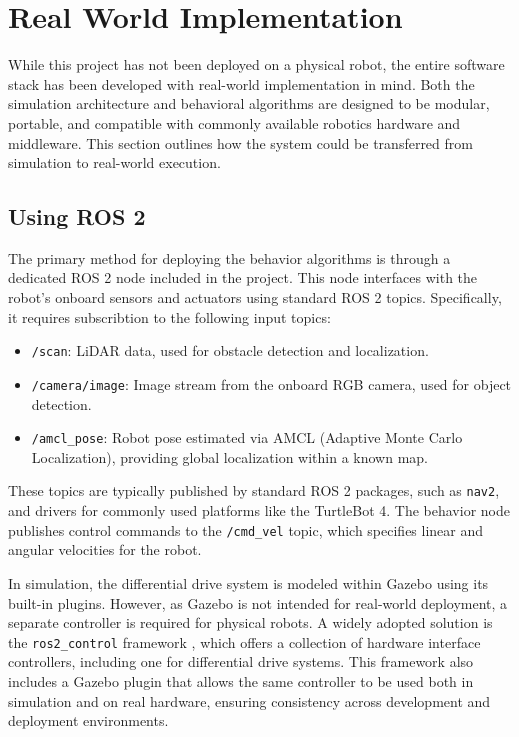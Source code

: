 \section{Real World Implementation}
While this project has not been deployed on a physical robot, the entire software stack has been developed with real-world implementation in mind. 
Both the simulation architecture and behavioral algorithms are designed to be modular, portable, and compatible with commonly available robotics hardware and middleware. 
This section outlines how the system could be transferred from simulation to real-world execution.

\subsection{Using ROS 2}
The primary method for deploying the behavior algorithms is through a dedicated ROS 2 node included in the project. 
This node interfaces with the robot’s onboard sensors and actuators using standard ROS 2 topics. 
Specifically, it requires subscribtion to the following input topics:

\begin{itemize}
  \item \texttt{/scan}: LiDAR data, used for obstacle detection and localization.
  \item \texttt{/camera/image}: Image stream from the onboard RGB camera, used for object detection.
  \item \texttt{/amcl\_pose}: Robot pose estimated via AMCL (Adaptive Monte Carlo Localization), providing global localization within a known map.
\end{itemize}

These topics are typically published by standard ROS 2 packages, such as \texttt{nav2}, and drivers for commonly used platforms like the TurtleBot 4. 
The behavior node publishes control commands to the \texttt{/cmd\_vel} topic, which specifies linear and angular velocities for the robot.

In simulation, the differential drive system is modeled within Gazebo using its built-in plugins. 
However, as Gazebo is not intended for real-world deployment, a separate controller is required for physical robots. 
A widely adopted solution is the \texttt{ros2\_control} framework \cite{ros2-control}, which offers a collection of hardware interface controllers, including one for differential drive systems.
This framework also includes a Gazebo plugin that allows the same controller to be used both in simulation and on real hardware, ensuring consistency across development and deployment environments.

